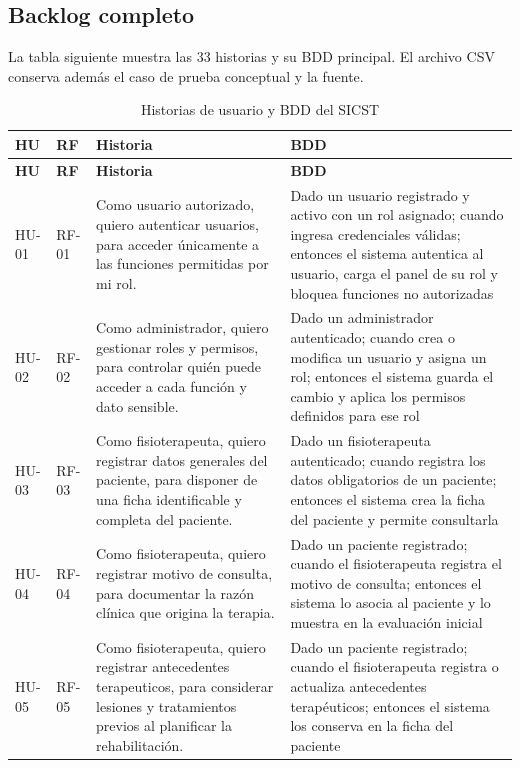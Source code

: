 \documentclass[12pt,a4paper]{article}
\begin{document}
\subsection{Backlog completo}
La tabla siguiente muestra las 33 historias y su BDD principal. El archivo CSV conserva además el caso de prueba conceptual y la fuente.
\scriptsize
\begin{longtable}{p{}p{}p{}p{}}
\caption{Historias de usuario y BDD del SICST}\\\toprule
\textbf{HU}&\textbf{RF}&\textbf{Historia}&\textbf{BDD}\\\midrule\endfirsthead
\toprule\textbf{HU}&\textbf{RF}&\textbf{Historia}&\textbf{BDD}\\\midrule\endhead

HU-01 & RF-01 & Como usuario autorizado, quiero autenticar usuarios, para acceder únicamente a las funciones permitidas por mi rol. & Dado un usuario registrado y activo con un rol asignado; cuando ingresa credenciales válidas; entonces el sistema autentica al usuario, carga el panel de su rol y bloquea funciones no autorizadas \\
HU-02 & RF-02 & Como administrador, quiero gestionar roles y permisos, para controlar quién puede acceder a cada función y dato sensible. & Dado un administrador autenticado; cuando crea o modifica un usuario y asigna un rol; entonces el sistema guarda el cambio y aplica los permisos definidos para ese rol \\
HU-03 & RF-03 & Como fisioterapeuta, quiero registrar datos generales del paciente, para disponer de una ficha identificable y completa del paciente. & Dado un fisioterapeuta autenticado; cuando registra los datos obligatorios de un paciente; entonces el sistema crea la ficha del paciente y permite consultarla \\
HU-04 & RF-04 & Como fisioterapeuta, quiero registrar motivo de consulta, para documentar la razón clínica que origina la terapia. & Dado un paciente registrado; cuando el fisioterapeuta registra el motivo de consulta; entonces el sistema lo asocia al paciente y lo muestra en la evaluación inicial \\
HU-05 & RF-05 & Como fisioterapeuta, quiero registrar antecedentes terapeuticos, para considerar lesiones y tratamientos previos al planificar la rehabilitación. & Dado un paciente registrado; cuando el fisioterapeuta registra o actualiza antecedentes terapéuticos; entonces el sistema los conserva en la ficha del paciente \\

\end{longtable}
\end{document}
